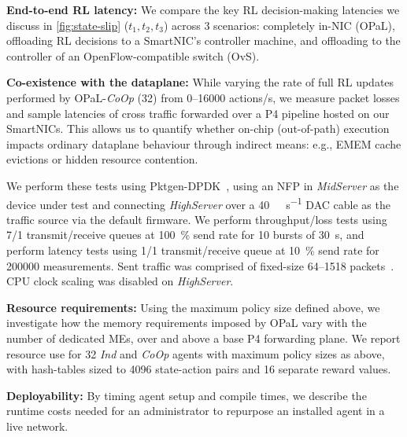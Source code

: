 \documentclass[sigconf,natbib=false]{acmart}
\newcommand{\fakepara}[1]{\noindent\textbf{#1:}}
\newcommand{\approachshort}{OPaL}
\newcommand{\Coopfw}{\emph{CoOp}}
\newcommand{\Indfw}{\emph{Ind}}
\begin{document}
\fakepara{End-to-end RL latency}
We compare the key RL decision-making latencies we discuss in \cref{fig:state-slip} ($t_1,t_2,t_3$) across 3 scenarios: completely in-NIC (\approachshort{}), offloading RL decisions to a SmartNIC's controller machine, and offloading to the controller of an OpenFlow-compatible switch (OvS).

\fakepara{Co-existence with the dataplane}
While varying the rate of full RL updates performed by \approachshort{}-\Coopfw{} (\SI{32}{\bit}) from \numrange{0}{16000} actions/s, we measure packet losses and sample latencies of cross traffic forwarded over a P4 pipeline hosted on our SmartNICs.
This allows us to quantify whether on-chip (out-of-path) execution impacts ordinary dataplane behaviour through indirect means: e.g., EMEM cache evictions or hidden resource contention.

We perform these tests using Pktgen-DPDK~\cite{pktgen-dpdk}, using an NFP in \emph{MidServer} as the device under test and connecting \emph{HighServer} over a \SI{40}{\giga\bit\per\second} DAC cable as the traffic source via the default firmware.
We perform throughput/loss tests using \num{7}/\num{1} transmit/receive queues at \SI{100}{\percent} send rate for 10 bursts of \SI{30}{\second}, and perform latency tests using \num{1}/\num{1} transmit/receive queue at \SI{10}{\percent} send rate for \num{200000} measurements.
Sent traffic was comprised of fixed-size \SIrange{64}{1518}{\byte} packets~\cite{rfc2544}.
CPU clock scaling was disabled on \emph{HighServer}.

\fakepara{Resource requirements}
Using the maximum policy size defined above, we investigate how the memory requirements imposed by \approachshort{} vary with the number of dedicated MEs, over and above a base P4 forwarding plane.
We report resource use for \SI{32}{\bit} \Indfw{} and \Coopfw{} agents with maximum policy sizes as above, with hash-tables sized to \num{4096} state-action pairs and \num{16} separate reward values.


\fakepara{Deployability}
By timing agent setup and compile times, we describe the runtime costs needed for an administrator to repurpose an installed agent in a live network.
\end{document}
